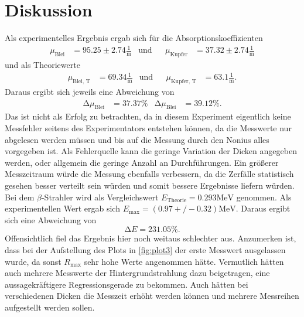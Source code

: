 \section{Diskussion}
\label{sec:Diskussion}

Als experimentelles Ergebnis ergab sich für die Absorptionskoeffizienten
\begin{align*}
    \mu_\text{Blei} &= 95.25 \pm 2.74 \frac{1}{\unit\meter}&\text{und}&&\mu_\text{Kupfer} &= 37.32 \pm 2.74 \frac{1}{\unit\meter}
\end{align*}
und als Theoriewerte 
\begin{align*}
    \mu_\text{Blei, T} &= 69.34 \frac{1}{\unit\meter}&\text{und}&&\mu_\text{Kupfer, T} &= 63.1 \frac{1}{\unit\meter}.
\end{align*} 
Daraus ergibt sich jeweils eine Abweichung von
\begin{align*}
    \increment \mu_\text{Blei} &= 37.37 \%&\increment \mu_\text{Blei} &= 39.12 \%.
\end{align*}
Das ist nicht als Erfolg zu betrachten, da in diesem Experiment eigentlich keine Messfehler seitens des
Experimentators entstehen können, da die Messwerte nur abgelesen werden müssen und bis auf die Messung durch den Nonius
alles vorgegeben ist.
Als Fehlerquelle kann die geringe Variation der Dicken angegeben werden, oder allgemein die geringe Anzahl an Durchführungen.
Ein größerer Messzeitraum würde die Messung ebenfalls verbessern, da die Zerfälle statistisch gesehen besser verteilt sein würden und somit bessere Ergebnisse liefern würden.\\

Bei dem $\beta$-Strahler wird als Vergleichswert \cite{technetium99} $E_\text{Theorie} = 0.293 \unit{\mega\eV}$ genommen.
Als experimentellen Wert ergab sich $E_\text{max} = (0.97+/-0.32) \unit{\mega\eV}$.
Daraus ergibt sich eine Abweichung von
\begin{equation*}
    \increment E = 231.05 \%.
\end{equation*}
Offensichtlich fiel das Ergebnis hier noch weitaus schlechter aus.
Anzumerken ist, dass bei der Aufstellung des Plots in \autoref{fig:plot3} der erste Messwert ausgelassen wurde, da sonst
$R_\text{max}$ sehr hohe Werte angenommen hätte.
Vermutlich hätten auch mehrere Messwerte der Hintergrundstrahlung dazu beigetragen, eine aussagekräftigere Regressionsgerade zu bekommen.
Auch hätten bei verschiedenen Dicken die Messzeit erhöht werden können und mehrere Messreihen aufgestellt werden sollen.